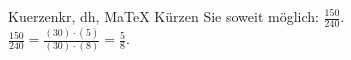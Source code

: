 \begin{MAufgabe}{Kuerzen}{kr, dh, MaTeX}
K\"urzen Sie soweit m\"oglich: $\frac{150}{240}$.\\ 
\ifLsg\MLoesung
\quad $\frac{150}{240}=\frac{(30)\cdot(5)}{(30)\cdot(8)}=\frac{5}{8}$.\else\relax\fi
 \end{MAufgabe}